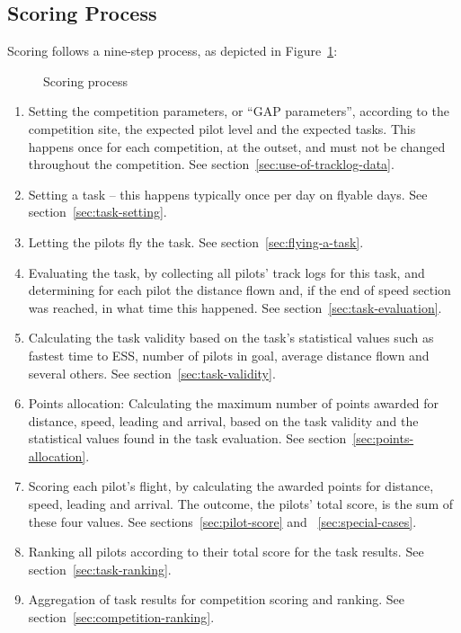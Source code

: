 \subsection{Scoring Process}
Scoring follows a nine-step process, as depicted in
Figure~\ref{fig:scoring-process}:

\begin{figure}[!ht]
    \centering
    
    \caption{Scoring process}
    \label{fig:scoring-process}
\end{figure}

\begin{enumerate}
    \item
        Setting the competition parameters, or “GAP parameters”, according to
        the competition site, the expected pilot level and the expected tasks.
        This happens once for each competition, at the outset, and must not be
        changed throughout the competition. See
        section~\ref{sec:use-of-tracklog-data}.
    \item
        Setting a task – this happens typically once per day on flyable days.
        See section~\ref{sec:task-setting}.
    \item
        Letting the pilots fly the task. See section~\ref{sec:flying-a-task}.
    \item
        Evaluating the task, by collecting all pilots’ track logs for this
        task, and determining for each pilot the distance flown and, if the end
        of speed section was reached, in what time this happened. See
        section~\ref{sec:task-evaluation}.
    \item
        Calculating the task validity based on the task’s statistical values
        such as fastest time to ESS, number of pilots in goal, average distance
        flown and several others. See section~\ref{sec:task-validity}.
    \item
        Points allocation: Calculating the maximum number of points awarded for
        distance, speed, leading and arrival, based on the task validity and
        the statistical values found in the task evaluation. See
        section~\ref{sec:points-allocation}.
    \item
        Scoring each pilot’s flight, by calculating the awarded points for
        distance, speed, leading and arrival. The outcome, the pilots’ total
        score, is the sum of these four values. See
        sections~\ref{sec:pilot-score} and ~\ref{sec:special-cases}.
    \item
        Ranking all pilots according to their total score for the task results.
        See section~\ref{sec:task-ranking}.
    \item
        Aggregation of task results for competition scoring and ranking. See
        section~\ref{sec:competition-ranking}.
\end{enumerate}

